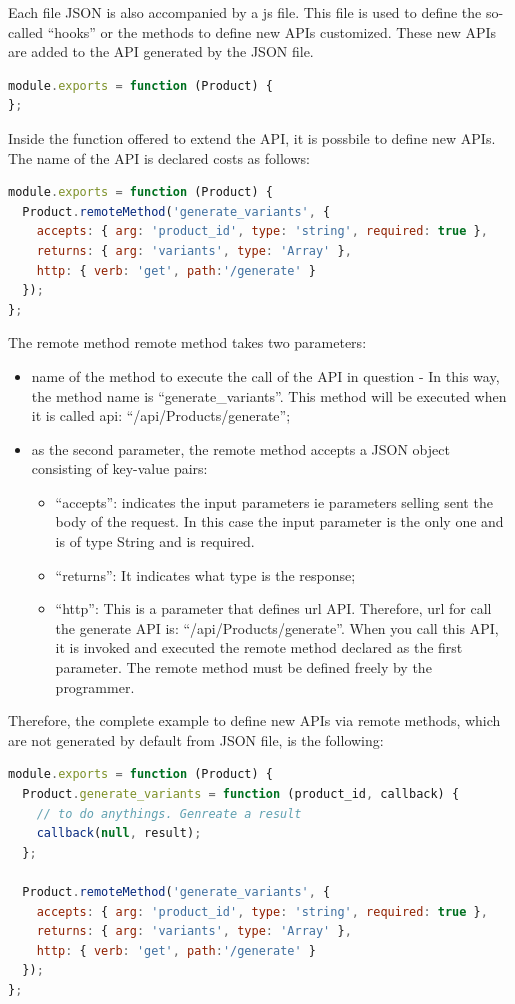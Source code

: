 Each file JSON is also accompanied by a js file. This file is used to define the so-called “hooks” or the methods to define new APIs customized. These new APIs are added to the API generated by the JSON file.
\begin{lstlisting}[language=javascript]
module.exports = function (Product) {
};
\end{lstlisting}
Inside the function offered to extend the API, it is possbile to define new APIs. The name of the API is declared costs as follows:
\begin{lstlisting}[language=javascript]
module.exports = function (Product) {
  Product.remoteMethod('generate_variants', {
    accepts: { arg: 'product_id', type: 'string', required: true },
    returns: { arg: 'variants', type: 'Array' },
    http: { verb: 'get', path:'/generate' }
  });
};
\end{lstlisting}
The remote method remote method takes two parameters:
\begin{itemize}
\item name of the method to execute the call of the API in question - In this way, the method name is “generate\_variants”. This method will be executed when it is called api: “/api/Products/generate”;
\item as the second parameter, the remote method accepts a JSON object consisting of key-value pairs:
\begin{itemize}
\item “accepts”: indicates the input parameters ie parameters selling sent the body of the request. In this case the input parameter is the only one and is of type String and is required.
\item “returns”: It indicates what type is the response;
\item “http”: This is a parameter that defines url API. Therefore, url for call the generate API is: “/api/Products/generate”. When you call this API, it is invoked and executed the remote method declared as the first parameter. The remote method must be defined freely by the programmer.
\end{itemize}
\end{itemize}
Therefore, the complete example to define new APIs via remote methods, which are not generated by default from JSON file, is the following:
\begin{lstlisting}[language=javascript]
module.exports = function (Product) {
  Product.generate_variants = function (product_id, callback) {
    // to do anythings. Genreate a result
    callback(null, result);
  };

  Product.remoteMethod('generate_variants', {
    accepts: { arg: 'product_id', type: 'string', required: true },
    returns: { arg: 'variants', type: 'Array' },
    http: { verb: 'get', path:'/generate' }
  });
};
\end{lstlisting}

